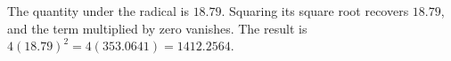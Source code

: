 The quantity under the radical is $18.79$. Squaring its square root recovers $18.79$, and the term multiplied by zero vanishes. The result is $4(18.79)^2=4(353.0641)=\boxed{1412.2564}$.
